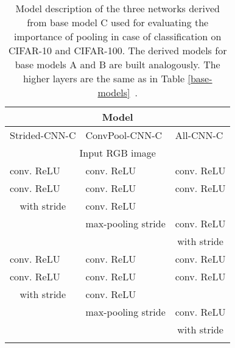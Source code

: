 \documentclass{article} \usepackage{iclr2015,times}
\begin{document}
\begin{table}[h]
\caption{Model description of the three networks derived from base model C used for evaluating the importance of pooling in case of classification on CIFAR-10 and CIFAR-100. The derived models for base models A and B are built analogously. The higher layers are the same as in Table \ref{base-models}~.}
\label{derived-models}
\begin{center}
\begin{small}
\begin{tabular}{l|l|l}
\multicolumn{3}{c}{\bf Model} \\
\hline
Strided-CNN-C         &  ConvPool-CNN-C & All-CNN-C \\
\hline
\multicolumn{3}{c}{Input  RGB image} \\
\hline
 conv.  ReLU  &  conv.  ReLU  &  conv.  ReLU  \\
 conv.  ReLU  &  conv.  ReLU  &  conv.  ReLU  \\
\multicolumn{1}{c|}{with stride }    &  conv.  ReLU  &  \\
\hline 
                                   &  max-pooling stride  &  conv.  ReLU  \\
                                   &                                     & \multicolumn{1}{c}{with stride } \\
\hline
 conv.  ReLU &  conv.  ReLU &  conv.  ReLU \\
 conv.  ReLU &  conv.  ReLU  &  conv.  ReLU \\
\multicolumn{1}{c|}{with stride }    &  conv.  ReLU &  \\
\hline
                                   &  max-pooling stride  &  conv.  ReLU \\
                                   &                                     & \multicolumn{1}{c}{with stride } \\
\hline
\multicolumn{3}{c}{} \\
\end{tabular}
\end{small}
\end{center}
\end{table}
\end{document}

